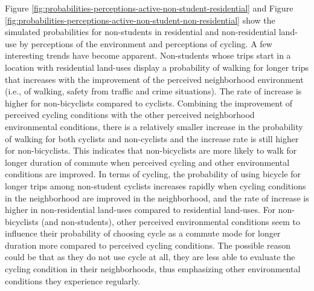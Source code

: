 \documentclass[]{elsarticle} %
\begin{document}
Figure
\ref{fig:probabilities-perceptions-active-non-student-residential} and
Figure
\ref{fig:probabilities-perceptions-active-non-student-non-residential}
show the simulated probabilities for non-students in residential and
non-residential land-use by perceptions of the environment and
perceptions of cycling. A few interesting trends have become apparent.
Non-students whose trips start in a location with residential land-uses
display a probability of walking for longer trips that increases with
the improvement of the perceived neighborhood environment (i.e., of
walking, safety from traffic and crime situations). The rate of increase
is higher for non-bicyclists compared to cyclists. Combining the
improvement of perceived cycling conditions with the other perceived
neighborhood environmental conditions, there is a relatively smaller
increase in the probability of walking for both cyclists and
non-cyclists and the increase rate is still higher for non-bicyclists.
This indicates that non-bicyclists are more likely to walk for longer
duration of commute when perceived cycling and other environmental
conditions are improved. In terms of cycling, the probability of using
bicycle for longer trips among non-student cyclists increases rapidly
when cycling conditions in the neighborhood are improved in the
neighborhood, and the rate of increase is higher in non-residential
land-uses compared to residential land-uses. For non-bicyclists (and
non-students), other perceived environmental conditions seem to
influence their probability of choosing cycle as a commute mode for
longer duration more compared to perceived cycling conditions. The
possible reason could be that as they do not use cycle at all, they are
less able to evaluate the cycling condition in their neighborhoods, thus
emphasizing other environmental conditions they experience regularly.
\end{document}
